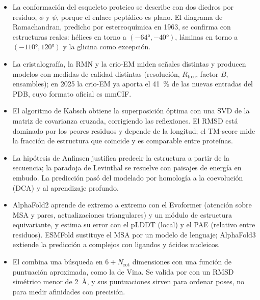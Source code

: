 \begin{resumen}
\begin{itemize}
  \item La conformación del esqueleto proteico se describe con dos diedros por residuo, $\phi$ y $\psi$, porque el enlace peptídico es plano. El diagrama de Ramachandran, predicho por estereoquímica en 1963, se confirma con estructuras reales: hélices en torno a $(-\ang{64},-\ang{40})$, láminas en torno a $(-\ang{110},\ang{120})$ y la glicina como excepción.
  \item La cristalografía, la RMN y la crio-EM miden señales distintas y producen modelos con medidas de calidad distintas (resolución, $R_{\text{free}}$, factor $B$, ensambles); en 2025 la crio-EM ya aporta el \SI{41}{\percent} de las nuevas entradas del PDB, cuyo formato oficial es mmCIF.
  \item El algoritmo de Kabsch obtiene la superposición óptima con una SVD de la matriz de covarianza cruzada, corrigiendo las reflexiones. El RMSD está dominado por los peores residuos y depende de la longitud; el TM-score mide la fracción de estructura que coincide y es comparable entre proteínas.
  \item La hipótesis de Anfinsen justifica predecir la estructura a partir de la secuencia; la paradoja de Levinthal se resuelve con paisajes de energía en embudo. La predicción pasó del modelado por homología a la coevolución (DCA) y al aprendizaje profundo.
  \item AlphaFold2 aprende de extremo a extremo con el Evoformer (atención sobre MSA y pares, actualizaciones triangulares) y un módulo de estructura equivariante, y estima su error con el pLDDT (local) y el PAE (relativo entre residuos). ESMFold sustituye el MSA por un modelo de lenguaje; AlphaFold3 extiende la predicción a complejos con ligandos y ácidos nucleicos.
  \item El  combina una búsqueda en $6+N_{\mathrm{rot}}$ dimensiones con una función de puntuación aproximada, como la de Vina. Se valida por  con un RMSD simétrico menor de \SI{2}{\angstrom}, y sus puntuaciones sirven para ordenar poses, no para medir afinidades con precisión.
\end{itemize}
\end{resumen}

